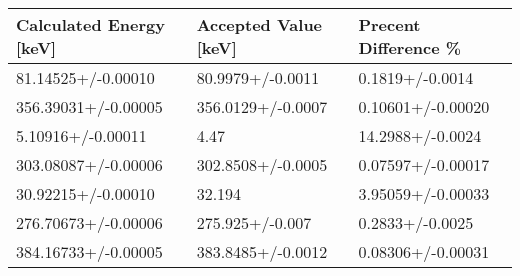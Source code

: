\begin{tabular}{lll}
\toprule
Calculated Energy [keV] & Accepted Value [keV] & Precent Difference \% \\
\midrule
     81.14525+/-0.00010 &     80.9979+/-0.0011 &      0.1819+/-0.0014 \\
    356.39031+/-0.00005 &    356.0129+/-0.0007 &    0.10601+/-0.00020 \\
      5.10916+/-0.00011 &                 4.47 &     14.2988+/-0.0024 \\
    303.08087+/-0.00006 &    302.8508+/-0.0005 &    0.07597+/-0.00017 \\
     30.92215+/-0.00010 &               32.194 &    3.95059+/-0.00033 \\
    276.70673+/-0.00006 &      275.925+/-0.007 &      0.2833+/-0.0025 \\
    384.16733+/-0.00005 &    383.8485+/-0.0012 &    0.08306+/-0.00031 \\
\bottomrule
\end{tabular}
